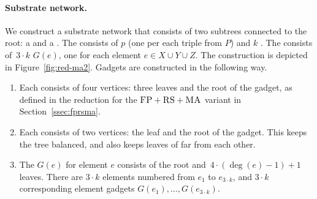 \paragraph{Substrate network.}
We construct a substrate network that consists of two subtrees connected to the
  root: a \emph{\MatchSubtree} and a \emph{\CoverSubtree}. The
  {\MatchSubtree} consists of $p$ \emph{\TripleGadgets} (one per each triple from $P$) and $k$
  \emph{\UnqGadgets}. The {\CoverSubtree} consists of~$3\cdot k$ \emph{\ElGadgets} $G(e)$, one for each element $e\in X\cup Y\cup Z$.
  The construction is depicted in Figure~\ref{fig:red-ma2}. Gadgets are constructed in the following way.
\begin{enumerate}
  \item Each {\TripleGadget} consists of four vertices: three leaves and the root of the gadget, as defined in the reduction for the $\textsc{FP}+\textsc{RS}+\textsc{MA}$ variant in Section~\ref{ssec:fprsma}.
  \item Each {\UnqGadget} consists of two vertices: the leaf and the root of the gadget.
  This keeps the tree balanced, and also keeps leaves of
  {\UnqGadgets} far from each other.
  \item The {\ElGadget} $G(e)$ for element $e$ consists of the
  root and~$4\cdot(\deg(e)-1)+1$ leaves. There are $3\cdot k$ elements numbered from $e_1$ to $e_{3\cdot k}$, and $3\cdot k $ corresponding element gadgets $G(e_1), \ldots, G(e_{3\cdot k})$.
\end{enumerate}

